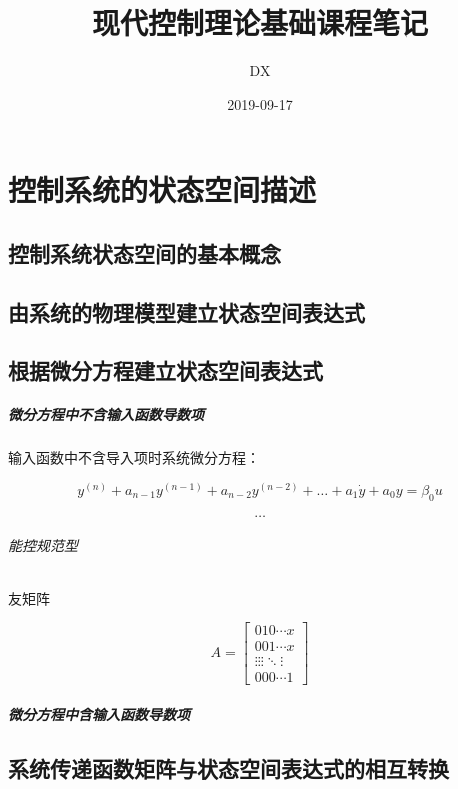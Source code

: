 \documentclass[11pt]{book}
\begin{document}
\title{现代控制理论基础课程笔记}
\author{DX}
\date{2019-09-17}
\maketitle

\chapter{控制系统的状态空间描述}   

\section{控制系统状态空间的基本概念}


\section{由系统的物理模型建立状态空间表达式}


\section{根据微分方程建立状态空间表达式}

\paragraph{微分方程中不含输入函数导数项}%
\label{par:微分方程中不含输入函数导数项}

输入函数中不含导入项时系统微分方程：

$$
y^{(n)} + a_{n-1}y^{(n-1)} + a_{n-2}y^{(n-2)} + \ldots + a_1 \dot y + a_0y = \beta_0u
$$

$$
\ldots
$$

\subparagraph{能控规范型}%
\label{par:能控规范型}

友矩阵

$$
A =
\left[
\begin{matrix}
0	1	0		\cdots	x \\
0	0	1		\cdots	x \\
\vdots	\vdots	\vdots	\ddots	\vdots \\
0	0	0	\cdots	1
\end{matrix}
\right]
$$

\paragraph{微分方程中含输入函数导数项}%
\label{par:微分方程中含输入函数导数项}


\section{系统传递函数矩阵与状态空间表达式的相互转换}
\end{document}
